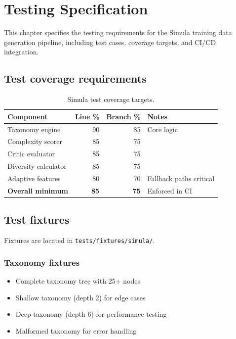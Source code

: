 \chapter{Testing Specification}\label{ch:testing}\label{sim:ch:testing}

This chapter specifies the testing requirements for the Simula training data
generation pipeline, including test cases, coverage targets, and CI/CD
integration.

\section{Test coverage requirements}

\begin{table}[htbp]
\centering
\caption{Simula test coverage targets.}
\label{tab:simula-coverage}
\footnotesize
\begin{tabularx}{\linewidth}{@{}l r r X@{}}
\toprule
\textbf{Component} & \textbf{Line \%} & \textbf{Branch \%} & \textbf{Notes} \\ \midrule
Taxonomy engine & 90 & 85 & Core logic \\
Complexity scorer & 85 & 75 & \\
Critic evaluator & 85 & 75 & \\
Diversity calculator & 85 & 75 & \\
Adaptive features & 80 & 70 & Fallback paths critical \\
\textbf{Overall minimum} & \textbf{85} & \textbf{75} & Enforced in CI \\
\bottomrule
\end{tabularx}
\end{table}

\section{Test fixtures}

Fixtures are located in \texttt{tests/fixtures/simula/}.

\subsection{Taxonomy fixtures}

\begin{itemize}
  \item Complete taxonomy tree with 25+ nodes
  \item Shallow taxonomy (depth 2) for edge cases
  \item Deep taxonomy (depth 6) for performance testing
  \item Malformed taxonomy for error handling
\end{itemize}

